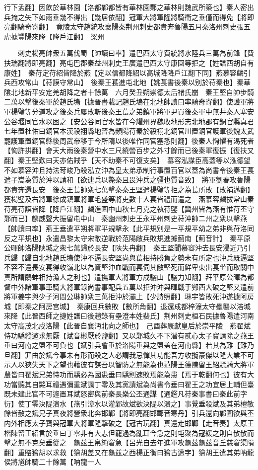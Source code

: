 行下孟翻】因飲於華林園【洛都鄴都皆有華林園鄴之華林則魏武所築也】秦人密出兵掩之矢下如雨垂幾不得出【幾居依翻】冠軍大將軍隆將騎衝之垂僅而得免【將即亮翻騎奇寄翻】　竟陵太守趙統攻襄陽秦荆州刺史都貴奔魯陽五月秦洛州刺史張五虎據豐陽來降【降戶江翻】　梁州

　　刺史楊亮帥衆五萬伐蜀【帥讀曰率】遣巴西太守費統將水陸兵三萬為前鋒【費扶瑞翻將即亮翻】亮屯巴郡秦益州刺史王廣遣巴西太守康回等拒之【姓譜西胡自有康姓】　秦苻定苻紹皆降於燕【定以信都降紹以高城降降戶江翻下同】燕慕容麟引兵西攻常山【苻謨守常山】　後秦王萇進屯北地【姚萇書後秦以别於苻秦也】秦華隂北地新平安定羌胡降之者十餘萬　六月癸丑朔崇德太后禇氏崩　秦王堅自帥步騎二萬以撃後秦軍於趙氏塢【據晉書載記趙氏塢在北地帥讀曰率騎奇寄翻】使護軍將軍楊璧等分道攻之後秦兵屢敗斬後秦王萇之弟鎮軍將軍尹買後秦軍中無井秦人塞安公谷堰同官水以困之【安公谷同官水皆在今耀州界魏收地形志北地郡有銅官縣真君七年置杜佑曰銅官本漢祋祤縣地晉為頻陽苻秦於祋祤北銅官川置銅官護軍後魏太武罷護軍置銅官縣後周武帝移于今所隋以後唯作同官塞悉則翻】後秦人恟懼有渴死者【恟許拱翻】會天大雨後秦營中水三尺繞營百步之外寸餘而已後秦軍復振【復扶又翻】秦王堅歎曰天亦佑賊乎【天不助秦不可復支矣】　慕容泓謀臣高蓋等以泓德望不如慕容沖且持法苛峻乃殺泓立沖為皇太弟承制行事置百官以蓋為尚書令後秦王萇遣子嵩為質於沖以請和【欲連兵以斃秦且畏沖兵之彊也質音致】　將軍劉春攻魯陽都貴奔還長安　後秦王萇帥衆七萬撃秦秦王堅遣楊璧等拒之為萇所敗【敗補邁翻】獲楊璧及右將軍徐成鎮軍將軍毛盛等將吏數十人萇皆禮而遣之　燕慕容麟拔常山秦苻亮苻謨皆降【降戶江翻】麟進圍中山秋七月克之執苻鑒【冀州皆為燕有惟苻丕守鄴而已】麟威聲大振留屯中山　秦幽州刺史王永平州刺史苻沖帥二州之衆以撃燕【帥讀曰率】燕王垂遣平朔將軍平規撃永【此平規别是一平規平幼之弟非與苻洛同反之平規也】永遣昌黎太守宋敞逆戰於范陽敞兵敗規進據薊南【薊音計】　秦平原公暉帥洛陽陕城之衆七萬歸於長安【陕失冉翻】　秦王堅聞慕容沖去長安浸近乃引兵歸【歸自北地趙氏塢使沖不逼長安堅尚與萇相持勝負之勢未有所定也沖兵既逼堅不容不還長安萇得收嶺北以為資堅沖血戰而萇伺其敝堅死而鮮卑東出萇坐而取關中真所謂鷸蚌相持漁人之利也】遣撫軍大將軍方戍驪山【驪力知翻】拜平原公暉為都督中外諸軍事車騎大將軍錄尚書事配兵五萬以拒沖沖與暉戰于鄭西大破之堅又遣前將軍姜宇與少子河間公琳帥衆三萬拒沖於灞上【少詩照翻】琳宇皆敗死沖遂據阿房城【即秦之阿房宮城】　秦康回兵數敗【數所角翻】退還成都梓潼太守壘襲以涪城來降【此晉西師之捷姓譜曰後趙錄有壘澄本姓裴氏】荆州刺史桓石民據魯陽遣河南太守高茂北戍洛陽【此晉自襄沔北向之師也】　己酉葬康獻皇后於崇平陵　燕翟斌恃功驕縱邀求無厭【斌音彬厭於鹽翻】又以鄴城久不下潜有貳心太子寶請除之燕王垂曰河南之盟不可負也【斌引兵會垂於洛陽垂與之盟盖在河南縣】若其為難【難乃旦翻】罪由於斌今事未有形而殺之人必謂我忌憚其功能吾方收攬豪傑以隆大業不可示人以狹失天下之望也藉彼有謀吾以智防之無能為也范陽王德陳留王紹驃騎大將軍農皆曰翟斌兄弟恃功而驕必為國患垂曰驕則速敗焉能為患【焉于乾翻何也】彼有大功當聽其自斃耳禮遇彌重斌諷丁零及其黨請斌為尚書令垂曰翟王之功宜居上輔但臺既未建此官不可遽置耳斌怒密與前秦長樂公丕通謀【通鑑凡苻秦事書曰秦此前字衍】使丁零決隄潰水【燕引漳水以灌鄴故斌欲決隄以潰之】事覺垂殺斌及其弟檀敏餘皆赦之斌兄子真夜將營衆北奔邯鄲【將即亮翻邯鄲音寒丹】引兵還向鄴圍欲與丕内外相應太子寶與冠軍大將軍隆撃破之【冠古玩翻】真還走邯鄲【走音奏】太原王楷陳留王紹言於垂曰丁零非有大志但寵過為亂耳今急之則屯聚為寇緩之則自散散而撃之無不克矣垂從之　龜兹王帛純窘急【呂光自去年進軍攻龜兹龜兹音丘慈窘渠隕翻】重賂獪胡以求救【獪胡盖又在龜兹之西楊正衡曰獪古邁字】獪胡王遣其弟呐龍侯將馗帥騎二十餘萬【呐龍一人